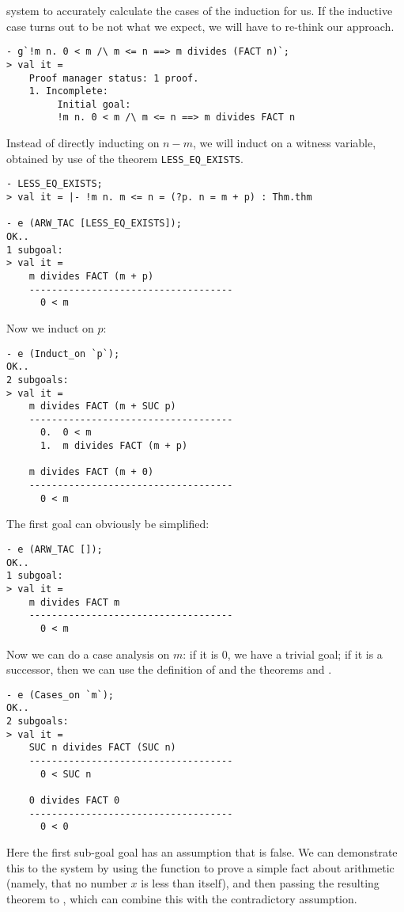 system to accurately calculate the cases of the induction for us. If the
inductive case turns out to be not what we expect, we will have to
re-think our approach.
\begin{session}\begin{verbatim}
- g`!m n. 0 < m /\ m <= n ==> m divides (FACT n)`;
> val it =
    Proof manager status: 1 proof.
    1. Incomplete:
         Initial goal:
         !m n. 0 < m /\ m <= n ==> m divides FACT n
\end{verbatim}\end{session}
Instead of directly inducting on $n-m$, we will induct on a witness
variable, obtained by use of the theorem \verb+LESS_EQ_EXISTS+.
\begin{session}\begin{verbatim}
- LESS_EQ_EXISTS;
> val it = |- !m n. m <= n = (?p. n = m + p) : Thm.thm

- e (ARW_TAC [LESS_EQ_EXISTS]);
OK..
1 subgoal:
> val it =
    m divides FACT (m + p)
    ------------------------------------
      0 < m
\end{verbatim}\end{session}
\noindent Now we induct on $p$:
\begin{session}\begin{verbatim}
- e (Induct_on `p`);
OK..
2 subgoals:
> val it =
    m divides FACT (m + SUC p)
    ------------------------------------
      0.  0 < m
      1.  m divides FACT (m + p)

    m divides FACT (m + 0)
    ------------------------------------
      0 < m
\end{verbatim}\end{session}
\noindent The first goal can obviously be simplified:
\begin{session}\begin{verbatim}
- e (ARW_TAC []);
OK..
1 subgoal:
> val it =
    m divides FACT m
    ------------------------------------
      0 < m
\end{verbatim}\end{session}
\noindent Now we can do a case analysis on $m$: if it is $0$, we have a
trivial goal; if it is a successor, then we can use the definition of
 and the theorems  and
.
\begin{session}\begin{verbatim}
- e (Cases_on `m`);
OK..
2 subgoals:
> val it =
    SUC n divides FACT (SUC n)
    ------------------------------------
      0 < SUC n

    0 divides FACT 0
    ------------------------------------
      0 < 0
\end{verbatim}\end{session}
    Here the first sub-goal goal has an assumption that is false.  We
    can demonstrate this to the system by using the 
    function to prove a simple fact about arithmetic (namely, that no
    number $x$ is less than itself), and then passing the resulting
    theorem to , which can combine this with the
    contradictory assumption.

